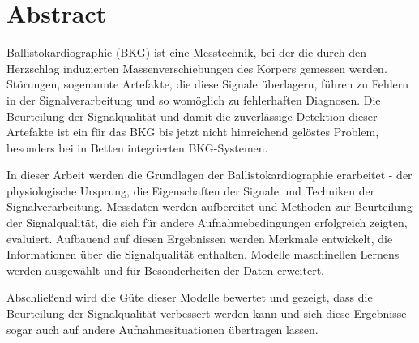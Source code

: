 \clearpage
\chapter*{Abstract}\label{abstract}


Ballistokardiographie (BKG) ist eine Messtechnik, bei der die durch den Herzschlag induzierten Massenverschiebungen des Körpers gemessen werden. Störungen, sogenannte Artefakte, die diese Signale überlagern, führen zu Fehlern in der Signalverarbeitung und so womöglich zu fehlerhaften Diagnosen. Die Beurteilung der Signalqualität und damit die zuverlässige Detektion dieser Artefakte ist ein für das BKG bis jetzt nicht hinreichend gelöstes Problem, besonders bei in Betten integrierten BKG-Systemen. 

In dieser Arbeit werden die Grundlagen der Ballistokardiographie erarbeitet - der physiologische Ursprung, die Eigenschaften der Signale und Techniken der Signalverarbeitung. Messdaten werden aufbereitet und Methoden zur Beurteilung der Signalqualität, die sich für andere Aufnahmebedingungen erfolgreich zeigten, evaluiert. Aufbauend auf diesen Ergebnissen werden Merkmale entwickelt, die Informationen über die Signalqualität enthalten. Modelle maschinellen Lernens werden ausgewählt und für Besonderheiten der Daten erweitert.

Abschließend wird die Güte dieser Modelle bewertet und gezeigt, dass die Beurteilung der Signalqualität verbessert werden kann und sich diese Ergebnisse sogar auch auf andere Aufnahmesituationen übertragen lassen.

